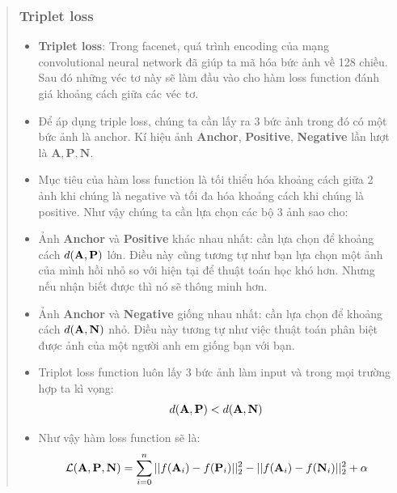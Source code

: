 \documentclass{article}
\begin{document}
\begin{quote}
\begin{itemize}
   \subsubsection{Triplet loss}
   \begin{itemize}
      \item \textbf{Triplet loss}: Trong facenet, quá trình encoding của mạng convolutional neural network đã giúp ta mã hóa bức ảnh về 128 chiều. Sau đó những véc tơ này sẽ làm đầu vào cho hàm loss function đánh giá khoảng cách giữa các véc tơ.
      \item Để áp dụng triple loss, chúng ta cần lấy ra 3 bức ảnh trong đó có một bức ảnh là anchor. 
      Kí hiệu ảnh \textbf{Anchor}, \textbf{Positive}, \textbf{Negative} lần lượt là \begin{math}
         \mathbf{A}, \mathbf{P}, \mathbf{N}
      \end{math}.
      \item Mục tiêu của hàm loss function là tối thiểu hóa khoảng cách giữa 2 ảnh khi chúng là negative và tối đa hóa khoảng cách khi chúng là positive. Như vậy chúng ta cần lựa chọn các bộ 3 ảnh sao cho:
      \item Ảnh \textbf{Anchor} và \textbf{Positive} khác nhau nhất: cần lựa chọn để khoảng cách \begin{math}
         \mathnormal{d}(\mathbf{A},\mathbf{P})
      \end{math} lớn. Điều này cũng tương tự như bạn lựa chọn một ảnh của mình hồi nhỏ so với hiện tại để thuật toán học khó hơn. Nhưng nếu nhận biết được thì nó sẽ thông minh hơn.
      \item Ảnh \textbf{Anchor} và \textbf{Negative} giống nhau nhất: cần lựa chọn để khoảng cách \begin{math}
         \mathnormal{d}(\mathbf{A},\mathbf{N})
      \end{math} nhỏ. Điều này tương tự như việc thuật toán phân biệt được ảnh của một người anh em giống bạn với bạn.
      \item Triplot loss function luôn lấy 3 bức ảnh làm input và trong mọi trường hợp ta kì vọng:
         \[ \mathnormal{d}(\mathbf{A},\mathbf{P}) < \mathnormal{d}(\mathbf{A},\mathbf{N}) \]
      \item Như vậy hàm loss function sẽ là:
         \[ \mathcal{L}(\mathbf{A}, \mathbf{P}, \mathbf{N}) = \sum^n_{i=0}||\mathnormal{f}(\mathbf{A}_i) - \mathnormal{f}(\mathbf{P}_i)||^2_2
         - ||\mathnormal{f}(\mathbf{A}_i) - \mathnormal{f}(\mathbf{N}_i)||^2_2
         + \alpha
         \]
         \begin{center}

\end{center}
\end{itemize}
\end{itemize}
\end{quote}
\end{document}
